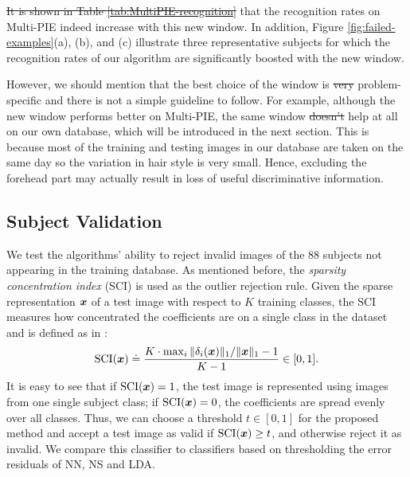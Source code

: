 \documentclass[12pt,journal,draftcls,letterpaper,onecolumn]{IEEEtran}
\providecommand{\DIFadd}[1]{{\protect\color{blue}\uwave{#1}}} %
\providecommand{\DIFdel}[1]{{\protect\color{red}\sout{#1}}}                      %
\providecommand{\DIFaddbegin}{} %
\providecommand{\DIFaddend}{} %
\providecommand{\DIFdelbegin}{} %
\providecommand{\DIFdelend}{} %
\begin{document}
\DIFdelbegin \DIFdel{It is shown in Table \ref{tab:MultiPIE-recognition} }\DIFdelend \DIFaddbegin \DIFadd{Table \ref{tab:MultiPIE-recognition} shows }\DIFaddend that the
recognition rates on Multi-PIE indeed increase with this new
window. In addition, Figure \ref{fig:failed-examples}(a), (b),
and (c) illustrate three representative subjects for which the
recognition rates of our algorithm are significantly boosted
with the new window. \DIFdelbegin %

\DIFdelend However, we should mention that the best choice of the window
is \DIFdelbegin \DIFdel{very }\DIFdelend problem-specific and there is
not a simple guideline to follow. For example, although the new
window performs better on Multi-PIE, the same window \DIFdelbegin \DIFdel{doesn't
}\DIFdelend \DIFaddbegin \DIFadd{does not
}\DIFaddend help at all on our own database, which will be introduced in
the next section. This is because most of the training and
testing images in our database are taken on the same day so the
variation in hair style is very small. Hence, excluding the
forehead part may actually result in loss of useful
discriminative information.

\subsection{Subject Validation}

We test the algorithms' ability to reject invalid images of the
88 subjects not appearing in the training database. As
mentioned before, the \emph{sparsity concentration index} (SCI)
is used as the outlier rejection rule. Given the sparse
representation ${\boldsymbol{x}}$ of a test image with respect to $K$
training classes, the SCI measures how concentrated the
coefficients are on a single class in the dataset and is
defined as in \cite{Wright2009-PAMI}:
\begin{displaymath}
\textup{SCI}({\boldsymbol{x}}) \doteq \frac{K \cdot \max_i \|\delta_i({\boldsymbol{x}})\|_1 /
\|{\boldsymbol{x}}\|_1 - 1}{K - 1} \in [0,1] .
\end{displaymath}
It is easy to see that if $\textup{SCI}({\boldsymbol{x}}) = 1$, the test
image is represented using images from one single subject
class; if $\textup{SCI}({\boldsymbol{x}}) = 0$, the coefficients are spread
evenly over all classes. Thus, we can choose a threshold $t \in
[0,1]$ for the proposed method and accept a test image as valid
if $\textup{SCI}({\boldsymbol{x}}) \geq t$, and otherwise reject it as
invalid. We compare this classifier to classifiers based on
thresholding the error residuals of NN, NS and LDA.
\end{document}
